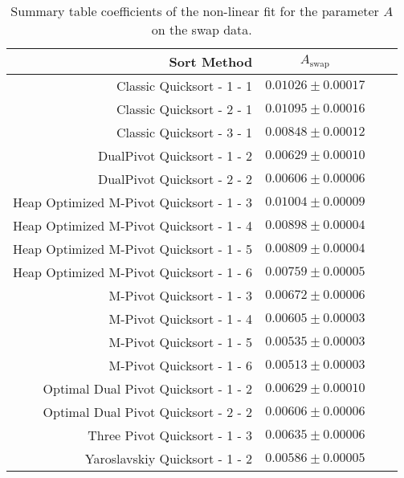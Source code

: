 


	\begin{table}
		\begin{center}
			\begin{tabular}{|r|c|c|c}
				\hline
								Sort Method              &   $A_{\text{swap}}$      \\ \hline \hline
				                Classic Quicksort - 1 - 1 &   $0.01026 \pm  0.00017$ \\ \hline
				                Classic Quicksort - 2 - 1 &   $0.01095 \pm  0.00016$ \\ \hline
				                Classic Quicksort - 3 - 1 &   $0.00848 \pm  0.00012$ \\ \hline
				              DualPivot Quicksort - 1 - 2 &   $0.00629 \pm  0.00010$ \\ \hline
				              DualPivot Quicksort - 2 - 2 &   $0.00606 \pm  0.00006$ \\ \hline
				 Heap Optimized M-Pivot Quicksort - 1 - 3 &   $0.01004 \pm  0.00009$ \\ \hline
				 Heap Optimized M-Pivot Quicksort - 1 - 4 &   $0.00898 \pm  0.00004$ \\ \hline
				 Heap Optimized M-Pivot Quicksort - 1 - 5 &   $0.00809 \pm  0.00004$ \\ \hline
				 Heap Optimized M-Pivot Quicksort - 1 - 6 &   $0.00759 \pm  0.00005$ \\ \hline
				                M-Pivot Quicksort - 1 - 3 &   $0.00672 \pm  0.00006$ \\ \hline
				                M-Pivot Quicksort - 1 - 4 &   $0.00605 \pm  0.00003$ \\ \hline
				                M-Pivot Quicksort - 1 - 5 &   $0.00535 \pm  0.00003$ \\ \hline
				                M-Pivot Quicksort - 1 - 6 &   $0.00513 \pm  0.00003$ \\ \hline
				     Optimal Dual Pivot Quicksort - 1 - 2 &   $0.00629 \pm  0.00010$ \\ \hline
				     Optimal Dual Pivot Quicksort - 2 - 2 &   $0.00606 \pm  0.00006$ \\ \hline
				            Three Pivot Quicksort - 1 - 3 &   $0.00635 \pm  0.00006$ \\ \hline
				           Yaroslavskiy Quicksort - 1 - 2 &   $0.00586 \pm  0.00005$ \\ \hline
			\end{tabular}
			\caption{Summary table coefficients of the non-linear fit for the parameter $A$ on the swap data.}
			\label{tab:swapFitCoeffA}
		\end{center}
	\end{table}


